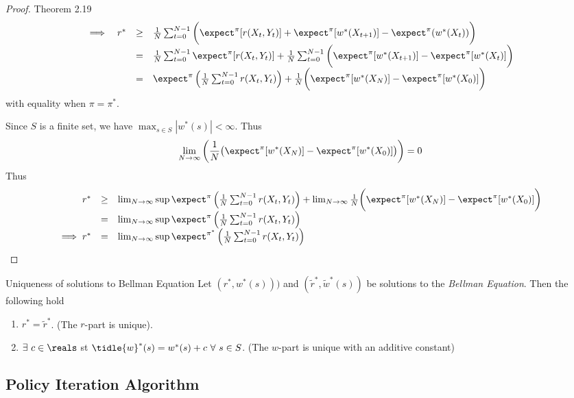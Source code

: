 \documentclass[11pt,a4paper]{article}
\begin{document}
\begin{proof}{Theorem 2.19}
\[\begin{array}{rrcl}
      \implies&r^*&\geq&\frac1N\sum_{t=0}^{N-1}\bigg(\expect^\pi[r(X_t,Y_t)]+\expect^\pi[w^*(X_{t+1})]-\expect^\pi(w^*(X_t))\bigg)\\
      &&=&\frac1N\sum_{t=0}^{N-1}\expect^\pi[r(X_t,Y_t)]+\frac1N\sum_{t=0}^{N-1}\bigg(\expect^\pi[w^*(X_{t+1})]-\expect^\pi[w^*(X_t)]\bigg)\\
      &&=&\expect^\pi\left(\frac1N\sum_{t=0}^{N-1}r(X_t,Y_t)\right)+\frac1N\bigg(\expect^\pi[w^*(X_N)]-\expect^\pi[w^*(X_0)]\bigg)
    \end{array}\]
    with equality when $\pi=\pi^*$.
    \par Since $S$ is a finite set, we have $\max_{s\in S}|w^*(s)|<\infty$. Thus
    \[ \lim_{N\to\infty}\bigg(\frac1N\big(\expect^\pi[w^*(X_N)]-\expect^\pi[w^*(X_0)]\big)\bigg)=0 \]
    Thus
    \[\begin{array}{rcl}
      r^*&\geq&\lim_{N\to\infty}\sup\expect^\pi\left(\frac1N\sum_{t=0}^{N-1}r(X_t,Y_t)\right)+\lim_{N\to\infty}\frac1N\bigg(\expect^\pi[w^*(X_N)]-\expect^\pi[w^*(X_0)]\bigg)\\
      &=&\lim_{N\to\infty}\sup\expect^\pi\left(\frac1N\sum_{t=0}^{N-1}r(X_t,Y_t)\right)\\
      \implies r^*&=&\lim_{N\to\infty}\sup\expect^{\pi^*}\left(\frac1N\sum_{t=0}^{N-1}r(X_t,Y_t)\right)
    \end{array}\]
    \proved
  \end{proof}

  \begin{theorem}{Uniqueness of solutions to Bellman Equation}
    Let $(r^*,w^*(s)))$ and $(\tilde{r}^*,\tilde{w}^*(s))$ be solutions to the \textit{Bellman Equation}. Then the following hold
    \begin{enumerate}
      \item $r^*=\tilde{r}^*$. (The $r$-part is unique).
      \item $\exists\ c\in\reals$ st $\tidle{w}^*(s)=w^*(s)+c\ \forall\ s\in S$. (The $w$-part is unique with an additive constant)
    \end{enumerate}
  \end{theorem}

\subsection*{Policy Iteration Algorithm}
\end{document}
